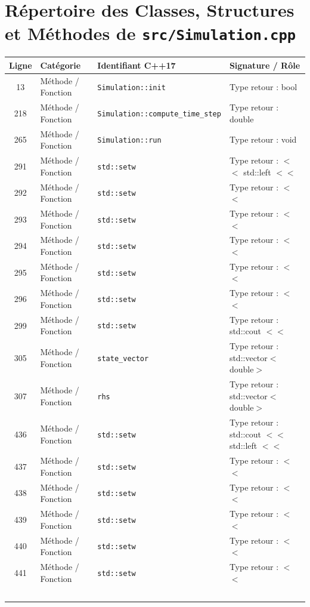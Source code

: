 \documentclass[10pt,a4paper,oneside]{book}
\begin{document}
\section{Répertoire des Classes, Structures et Méthodes de \texttt{src/Simulation.cpp}}
\begin{center}\small
\begin{tabular}{clll}
\toprule
\textbf{Ligne} & \textbf{Catégorie} & \textbf{Identifiant C++17} & \textbf{Signature / Rôle} \\
\midrule
13 & Méthode / Fonction & \texttt{Simulation::init} & Type retour : bool \\
218 & Méthode / Fonction & \texttt{Simulation::compute\_time\_step} & Type retour : double \\
265 & Méthode / Fonction & \texttt{Simulation::run} & Type retour : void \\
291 & Méthode / Fonction & \texttt{std::setw} & Type retour : $<$$<$ std::left $<$$<$ \\
292 & Méthode / Fonction & \texttt{std::setw} & Type retour : $<$$<$ \\
293 & Méthode / Fonction & \texttt{std::setw} & Type retour : $<$$<$ \\
294 & Méthode / Fonction & \texttt{std::setw} & Type retour : $<$$<$ \\
295 & Méthode / Fonction & \texttt{std::setw} & Type retour : $<$$<$ \\
296 & Méthode / Fonction & \texttt{std::setw} & Type retour : $<$$<$ \\
299 & Méthode / Fonction & \texttt{std::setw} & Type retour : std::cout $<$$<$ \\
305 & Méthode / Fonction & \texttt{state\_vector} & Type retour : std::vector$<$double$>$ \\
307 & Méthode / Fonction & \texttt{rhs} & Type retour : std::vector$<$double$>$ \\
436 & Méthode / Fonction & \texttt{std::setw} & Type retour : std::cout $<$$<$ std::left $<$$<$ \\
437 & Méthode / Fonction & \texttt{std::setw} & Type retour : $<$$<$ \\
438 & Méthode / Fonction & \texttt{std::setw} & Type retour : $<$$<$ \\
439 & Méthode / Fonction & \texttt{std::setw} & Type retour : $<$$<$ \\
440 & Méthode / Fonction & \texttt{std::setw} & Type retour : $<$$<$ \\
441 & Méthode / Fonction & \texttt{std::setw} & Type retour : $<$$<$ \\
$$
\end{tabular}
\end{center}
\end{document}

